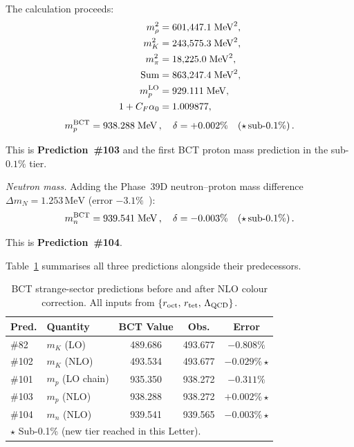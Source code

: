 \documentclass[twocolumn,10pt,a4paper]{article}
\begin{document}
\noindent
The calculation proceeds:
\begin{align}
  m_\rho^2 &= 601{,}447.1\;\mathrm{MeV}^2, \notag\\
  m_K^2    &= 243{,}575.3\;\mathrm{MeV}^2, \notag\\
  m_\pi^2  &= 18{,}225.0\;\mathrm{MeV}^2, \notag\\
  \mathrm{Sum} &= 863{,}247.4\;\mathrm{MeV}^2, \label{eq:sum103}\\
  m_p^{\rm LO}  &= 929.111\;\mathrm{MeV}, \notag\\
  1+C_F\alpha_0 &= 1.009877, \notag
\end{align}
\begin{equation}
  \label{eq:mp103result}
  m_p^{\rm BCT} = 938.288\;\mathrm{MeV}\,,\quad
  \delta = +0.002\%\quad(\star\,\text{sub-}0.1\%)\,.
\end{equation}

This is \textbf{Prediction~\#103} and the first BCT proton mass prediction
in the sub-$0.1\%$ tier.

\textit{Neutron mass.}\quad
Adding the Phase~39D neutron--proton mass difference $\Delta m_N = 1.253\,\mathrm{MeV}$
(error $-3.1\%$~\cite{monograph}):
\begin{equation}
  \label{eq:mn104}
  m_n^{\rm BCT} = 939.541\;\mathrm{MeV}\,,\quad
  \delta = -0.003\%\quad(\star\,\text{sub-}0.1\%)\,.
\end{equation}

This is \textbf{Prediction~\#104}.

Table~\ref{tab:results} summarises all three predictions alongside their
predecessors.

\begin{table}[h]
\centering
\caption{BCT strange-sector predictions before and after NLO colour
  correction.  All inputs from $\{r_{\rm oct},\,r_{\rm tet},\,\Lambda_{\rm QCD}\}$.}
\label{tab:results}
\small
\setlength{\tabcolsep}{4pt}
\begin{tabular}{llccc}
\toprule
Pred. & Quantity & BCT Value & Obs. & Error \\
\midrule
\#82  & $m_K$ (LO) & 489.686 & 493.677 & $-0.808\%$ \\
\#102 & $m_K$ (NLO)& 493.534 & 493.677 & $-0.029\%$\,$\star$ \\
\midrule
\#101 & $m_p$ (LO chain)& 935.350 & 938.272 & $-0.311\%$ \\
\#103 & $m_p$ (NLO) & 938.288 & 938.272 & $+0.002\%$\,$\star$ \\
\midrule
\#104 & $m_n$ (NLO) & 939.541 & 939.565 & $-0.003\%$\,$\star$ \\
\bottomrule
\multicolumn{5}{l}{$\star$ Sub-0.1\% (new tier reached in this Letter).}
\end{tabular}
\end{table}
\end{document}
